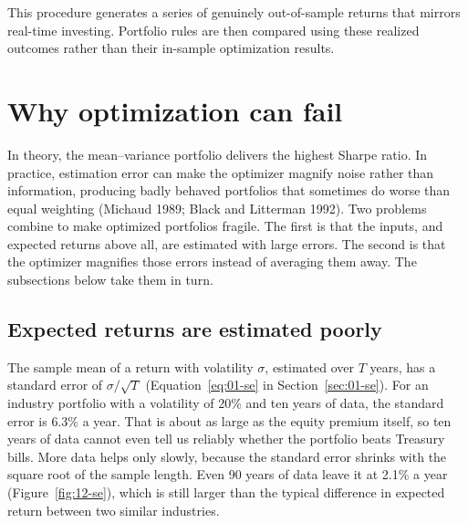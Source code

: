 This procedure generates a series of genuinely out-of-sample returns that mirrors real-time investing. Portfolio rules are then compared using these realized outcomes rather than their in-sample optimization results.


\section{Why optimization can fail}
\label{sec:12-how}

In theory, the mean--variance portfolio delivers the highest Sharpe ratio. In practice, estimation error can make the optimizer magnify noise rather than information, producing badly behaved portfolios that sometimes do worse than equal weighting (Michaud 1989; Black and Litterman 1992). Two problems combine to make optimized portfolios fragile. The first is that the inputs, and expected returns above all, are estimated with large errors. The second is that the optimizer magnifies those errors instead of averaging them away. The subsections below take them in turn.

\subsection{Expected returns are estimated poorly}
\label{sec:12-estimation}

The sample mean of a return with volatility $\sigma$, estimated over $T$ years, has a standard error of $\sigma/\sqrt{T}$ (Equation~\eqref{eq:01-se} in Section~\ref{sec:01-se}). For an industry portfolio with a volatility of 20\% and ten years of data, the standard error is 6.3\% a year. That is about as large as the equity premium itself, so ten years of data cannot even tell us reliably whether the portfolio beats Treasury bills. More data helps only slowly, because the standard error shrinks with the square root of the sample length. Even 90 years of data leave it at 2.1\% a year (Figure~\ref{fig:12-se}), which is still larger than the typical difference in expected return between two similar industries.

